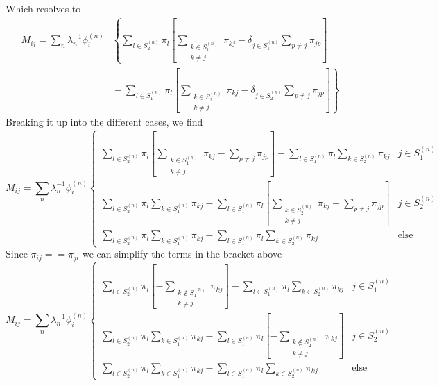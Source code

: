 \documentclass[a4paper]{article}
\newcommand{\evec}[2]{\phi^{(#2)}_{#1}}
\begin{document}
Which resolves to
\begin{align}
M_{ij} = 
\sum_n \lambda_n^{-1} \evec{i}{n} 
& \left\{ 
  \sum_{l \in S_2^{(n)}}   \pi_l
  \left[
  \sum_{\substack{k \in S_1^{(n)} \\ k \ne j}} 
  \pi_{kj}
   - \delta_{j \in S_1^{(n)}}
   \sum_{p \ne j} \pi_{jp}
  \right]
  \right. \\ & \left. 
  {} - \sum_{l \in S_1^{(n)}} \pi_l
  \left[
  \sum_{\substack{k \in S_2^{(n)} \\ k \ne j}} 
  \pi_{kj}
   - \delta_{j \in S_2^{(n)}}
   \sum_{p \ne j} \pi_{jp}
  \right]
\right\}
\end{align}
Breaking it up into the different cases, we find
\begin{equation}
M_{ij} = \sum_n \lambda_n^{-1} \evec{i}{n} 
\begin{cases}
\sum_{l \in S_2^{(n)}} \pi_l
  \left[
  \sum_{\substack{k \in S_1^{(n)} \\ k \ne j}} 
  \pi_{kj}
   - \sum_{p \ne j} \pi_{jp} 
  \right]
  - \sum_{l \in S_1^{(n)}} \pi_l \sum_{k \in S_2^{(n)}}  \pi_{kj}
 & j \in S_1^{(n)} \\
\sum_{l \in S_2^{(n)}} \pi_l \sum_{k \in S_1^{(n)}}  \pi_{kj}
-  \sum_{l \in S_1^{(n)}} \pi_l 
\left[
  \sum_{\substack{k \in S_2^{(n)} \\ k \ne j}} 
  \pi_{kj}
   - \sum_{p \ne j} \pi_{jp} 
  \right]
& j \in S_2^{(n)} \\
\sum_{l \in S_2^{(n)}} \pi_l \sum_{k \in S_1^{(n)}}  \pi_{kj}
- 
\sum_{l \in S_1^{(n)}} \pi_l \sum_{k \in S_2^{(n)}}  \pi_{kj}
& \text{else}
\end{cases}
\end{equation}
Since $\pi_{ij} == \pi_{ji}$ we can simplify the terms in the bracket above
\begin{equation}
M_{ij} = \sum_n \lambda_n^{-1} \evec{i}{n} 
\begin{cases}
\sum_{l \in S_2^{(n)}} \pi_l
  \left[-
  \sum_{\substack{k \notin S_1^{(n)} \\ k \ne j}} 
  \pi_{kj}
  \right]
  - \sum_{l \in S_1^{(n)}} \pi_l \sum_{k \in S_2^{(n)}}  \pi_{kj}
 & j \in S_1^{(n)} \\
\sum_{l \in S_2^{(n)}} \pi_l \sum_{k \in S_1^{(n)}}  \pi_{kj}
-  \sum_{l \in S_1^{(n)}} \pi_l 
\left[-
  \sum_{\substack{k \notin S_2^{(n)} \\ k \ne j}} 
  \pi_{kj}
  \right]
& j \in S_2^{(n)} \\
\sum_{l \in S_2^{(n)}} \pi_l \sum_{k \in S_1^{(n)}}  \pi_{kj}
- 
\sum_{l \in S_1^{(n)}} \pi_l \sum_{k \in S_2^{(n)}}  \pi_{kj}
& \text{else}
\end{cases}
\end{equation}
\end{document}

